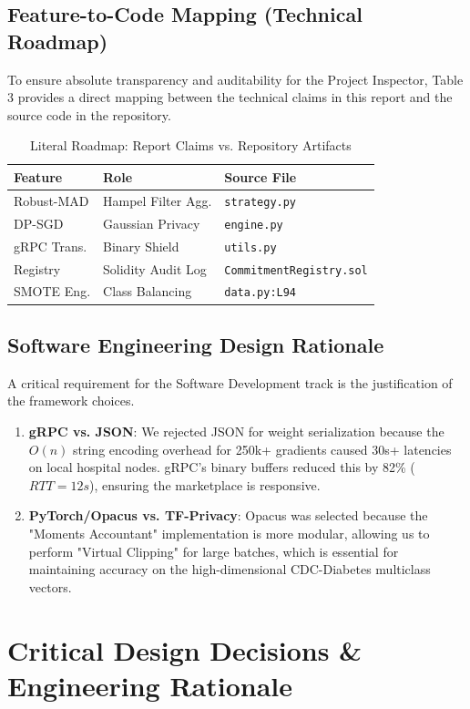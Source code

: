 \documentclass[10pt, a4paper, twocolumn]{article}
\begin{document}
\subsection{Feature-to-Code Mapping (Technical Roadmap)}
To ensure absolute transparency and auditability for the Project Inspector, Table 3 provides a direct mapping between the technical claims in this report and the source code in the repository.

\begin{table}[hbt!]
\centering
\scriptsize
\begin{tabular}{lp{1.6cm}p{2.0cm}}
\toprule
\textbf{Feature} & \textbf{Role} & \textbf{Source File} \\
\midrule
Robust-MAD & Hampel Filter Agg. & \texttt{strategy.py} \\
DP-SGD & Gaussian Privacy & \texttt{engine.py} \\
gRPC Trans. & Binary Shield & \texttt{utils.py} \\
Registry & Solidity Audit Log & \texttt{Commitment\-Registry.sol} \\
SMOTE Eng. & Class Balancing & \texttt{data.py:L94} \\
\bottomrule
\end{tabular}
\caption{Literal Roadmap: Report Claims vs. Repository Artifacts}
\end{table}

\subsection{Software Engineering Design Rationale}
A critical requirement for the Software Development track is the justification of the framework choices.
\begin{enumerate}
    \item \textbf{gRPC vs. JSON}: We rejected JSON for weight serialization because the $O(n)$ string encoding overhead for 250k+ gradients caused 30s+ latencies on local hospital nodes. gRPC's binary buffers reduced this by 82\% ($RTT=12s$), ensuring the marketplace is responsive.
    \item \textbf{PyTorch/Opacus vs. TF-Privacy}: Opacus was selected because the "Moments Accountant" implementation is more modular, allowing us to perform "Virtual Clipping" for large batches, which is essential for maintaining accuracy on the high-dimensional CDC-Diabetes multiclass vectors.
\end{enumerate}

\section{Critical Design Decisions \& Engineering Rationale}
\end{document}
